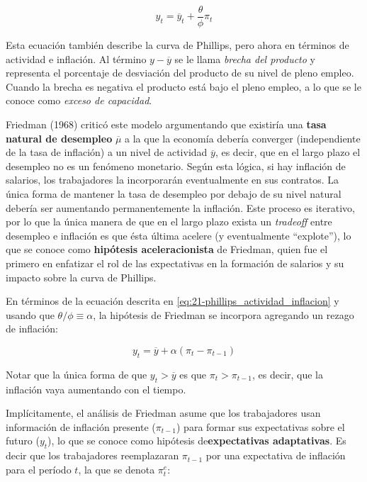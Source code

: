 \documentclass[DeGregorioResumen]{subfiles}
\begin{document}
\begin{equation}
	y_t = \overline y_t + \frac{\theta}{\phi}\pi_t
	\label{eq:21-phillips_actividad_inflacion}
\end{equation}

Esta ecuación también describe la curva de Phillips, pero ahora en términos de actividad e inflación. Al término $y-\overline y$ se le llama \emph{brecha del producto} y representa el porcentaje de desviación del producto de su nivel de pleno empleo. Cuando la brecha es negativa el producto está bajo el pleno empleo, a lo que se le conoce como \emph{exceso de capacidad}.

Friedman (1968) criticó este modelo argumentando que existiría una \textbf{tasa natural de desempleo} $\overline{\mu}$ a la que la economía debería converger (independiente de la tasa de inflación) a un nivel de actividad $\overline{y}$, es decir, que en el largo plazo el desempleo no es un fenómeno monetario. Según esta lógica, si hay inflación de salarios, los trabajadores la incorporarán eventualmente en sus contratos. La única forma de mantener la tasa de desempleo por debajo de su nivel natural debería ser aumentando permanentemente la inflación. Este proceso es iterativo, por lo que la única manera de que en el largo plazo exista un \textit{tradeoff} entre desempleo e inflación es que ésta última acelere (y eventualmente ``explote''), lo que se conoce como \textbf{hipótesis aceleracionista} de Friedman, quien fue el primero en enfatizar el rol de las expectativas en la formación de salarios y su impacto sobre la curva de Phillips.

En términos de la ecuación descrita en \eqref{eq:21-phillips_actividad_inflacion} y usando que $\theta/\phi \equiv \alpha$, la hipótesis de Friedman se incorpora agregando un rezago de inflación:

\begin{equation*}
	y_t = \overline y + \alpha(\pi_t-\pi_{t-1})
\end{equation*}

Notar que la única forma de que $y_t>\overline y$ es que $\pi_t>\pi_{t-1}$, es decir, que la inflación vaya aumentando con el tiempo.

Implícitamente, el análisis de Friedman asume que los trabajadores usan información de inflación presente ($\pi_{t-1}$) para formar sus expectativas sobre el futuro ($y_t$), lo que se conoce como hipótesis de\textbf{expectativas adaptativas}. Es decir que los trabajadores reemplazaran $\pi_{t-1}$ por una expectativa de inflación para el período $t$, la que se denota $\pi^e_t$:
\end{document}

